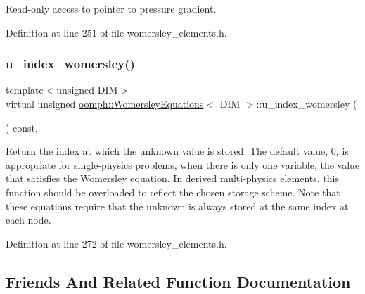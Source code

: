 Read-\/only access to pointer to pressure gradient. 



Definition at line 251 of file womersley\+\_\+elements.\+h.

\mbox{\label{classoomph_1_1WomersleyEquations_afd739de1c8e01b1d9409c05db9ced366}} 
\subsubsection{\texorpdfstring{u\+\_\+index\+\_\+womersley()}{u\_index\_womersley()}}
{\footnotesize\ttfamily template$<$unsigned D\+IM$>$ \\
virtual unsigned \hyperlink{classoomph_1_1WomersleyEquations}{oomph\+::\+Womersley\+Equations}$<$ D\+IM $>$\+::u\+\_\+index\+\_\+womersley (\begin{DoxyParamCaption}{ }\end{DoxyParamCaption}) const\hspace{0.3cm}{\ttfamily [inline]}, {\ttfamily [virtual]}}



Return the index at which the unknown value is stored. The default value, 0, is appropriate for single-\/physics problems, when there is only one variable, the value that satisfies the Womersley equation. In derived multi-\/physics elements, this function should be overloaded to reflect the chosen storage scheme. Note that these equations require that the unknown is always stored at the same index at each node. 



Definition at line 272 of file womersley\+\_\+elements.\+h.



\subsection{Friends And Related Function Documentation}
\mbox{\label{classoomph_1_1WomersleyEquations_a216440116a86af2614ff792554f8f745}} 
